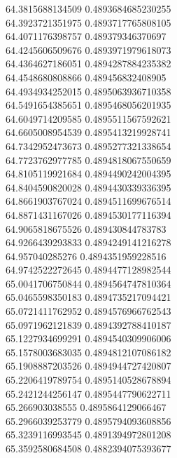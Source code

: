 {64.3815688134509 0.4893684685230255
 \\
64.3923721351975 0.4893717765808105
 \\
64.4071176398757 0.489379346370697
 \\
64.4245606509676 0.4893971979618073
 \\
64.4364627186051 0.4894287884235382
 \\
64.4548680808866 0.489456832408905
 \\
64.4934934252015 0.4895063936710358
 \\
64.5491654385651 0.4895468056201935
 \\
64.6049714209585 0.4895511567592621
 \\
64.6605008954539 0.4895413219928741
 \\
64.7342952473673 0.4895277321338654
 \\
64.7723762977785 0.4894818067550659
 \\
64.8105119921684 0.4894490242004395
 \\
64.8404590820028 0.4894430339336395
 \\
64.8661903767024 0.4894511699676514
 \\
64.8871431167026 0.4894530177116394
 \\
64.9065818675526 0.489430844783783
 \\
64.9266439293833 0.4894249141216278
 \\
64.957040285276 0.4894351959228516
 \\
64.9742522272645 0.4894477128982544
 \\
65.0041706750844 0.4894564747810364
 \\
65.0465598350183 0.4894735217094421
 \\
65.0721411762952 0.4894576966762543
 \\
65.0971962121839 0.4894392788410187
 \\
65.1227934699291 0.4894540309906006
 \\
65.1578003683035 0.4894812107086182
 \\
65.1908887203526 0.4894944727420807
 \\
65.2206419789754 0.4895140528678894
 \\
65.2421244256147 0.4895447790622711
 \\
65.266903038555 0.4895864129066467
 \\
65.2966039253779 0.4895794093608856
 \\
65.3239116993545 0.4891394972801208
 \\
65.3592580684508 0.4882394075393677
 \\
}
